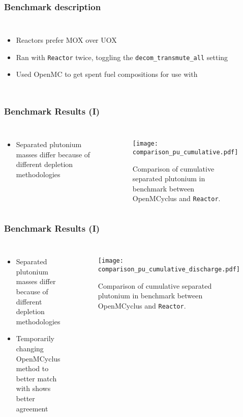 \begin{frame}
    \frametitle{Benchmark description}
    \begin{columns}
        \column[t]{5cm}
        \begin{itemize}
            \item Reactors prefer MOX over UOX
            \item Ran with \Cycamore \texttt{Reactor} twice, toggling 
                  the \texttt{decom\_transmute\_all} setting
            \item Used OpenMC to get spent fuel compositions for use with 
                  \Cycamore
        \end{itemize}
        \column[t]{5cm}
        
    \end{columns}
\end{frame}

\begin{frame}
    \frametitle{Benchmark Results (I)}
    \begin{columns}
        \column[t]{3.5cm}
        \begin{itemize}
            \item Separated plutonium masses differ because of 
                  different depletion methodologies
        \end{itemize}
        \column[t]{6.5cm}
        \begin{figure}
            \centering 
            \texttt{[image: comparison\_pu\_cumulative.pdf]}
            \caption{Comparison of cumulative separated plutonium in benchmark between 
            OpenMCyclus and \Cycamore \texttt{Reactor}.}
        \end{figure}
    \end{columns}
\end{frame}

\begin{frame}
    \frametitle{Benchmark Results (I)}
    \begin{columns}
        \column[t]{3.5cm}
        \begin{itemize}
            \item Separated plutonium masses differ because of 
                  different depletion methodologies
            \item Temporarily changing OpenMCyclus method to better 
                  match with \Cycamore shows better agreement
        \end{itemize}
        \column[t]{6.5cm}
        \begin{figure}
            \centering 
            \texttt{[image: comparison\_pu\_cumulative\_discharge.pdf]}
            \caption{Comparison of cumulative separated plutonium in benchmark between 
            OpenMCyclus and \Cycamore \texttt{Reactor}.}
        \end{figure}
    \end{columns}
\end{frame}

